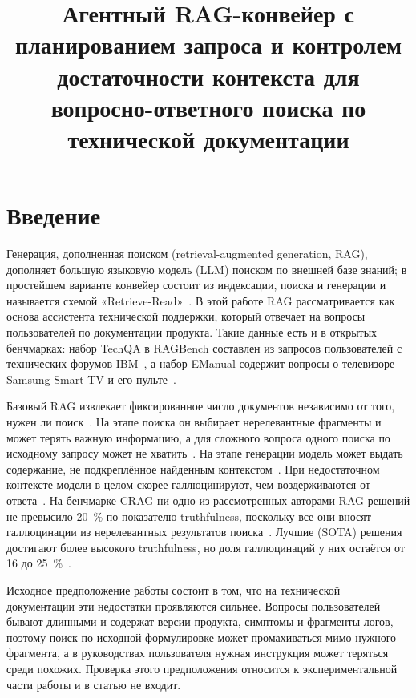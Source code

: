 \documentclass{misisarticle}
\title{Агентный RAG-конвейер с планированием запроса и контролем достаточности контекста для вопросно-ответного поиска по технической документации}
\begin{document}
\maketitle

\section{Введение}

Генерация, дополненная поиском (retrieval-augmented generation, RAG), дополняет большую языковую модель (LLM) поиском по внешней базе знаний; в простейшем варианте конвейер состоит из индексации, поиска и генерации и называется схемой «Retrieve-Read»~\cite{gao2023retrieval}. %
В этой работе RAG рассматривается как основа ассистента технической поддержки, который отвечает на вопросы пользователей по документации продукта.
Такие данные есть и в открытых бенчмарках: набор TechQA в RAGBench составлен из запросов пользователей с технических форумов IBM~\cite{friel2024ragbench}, %
а набор EManual содержит вопросы о телевизоре Samsung Smart TV и его пульте~\cite{friel2024ragbench}. %

Базовый RAG извлекает фиксированное число документов независимо от того, нужен ли поиск~\cite{asai2023selfrag}. %
На этапе поиска он выбирает нерелевантные фрагменты и может терять важную информацию, а для сложного вопроса одного поиска по исходному запросу может не хватить~\cite{gao2023retrieval}. %
На этапе генерации модель может выдать содержание, не подкреплённое найденным контекстом~\cite{gao2023retrieval}. %
При недостаточном контексте модели в целом скорее галлюцинируют, чем воздерживаются от ответа~\cite{joren2024sufficient}. %
На бенчмарке CRAG ни одно из рассмотренных авторами RAG-решений не превысило 20~\% по показателю truthfulness, поскольку все они вносят галлюцинации из нерелевантных результатов поиска~\cite{yang2024crag}. %
Лучшие (SOTA) решения достигают более высокого truthfulness, но доля галлюцинаций у них остаётся от 16 до 25~\%~\cite{yang2024crag}. %

Исходное предположение работы состоит в том, что на технической документации эти недостатки проявляются сильнее.
Вопросы пользователей бывают длинными и содержат версии продукта, симптомы и фрагменты логов, поэтому поиск по исходной формулировке может промахиваться мимо нужного фрагмента, а в руководствах пользователя нужная инструкция может теряться среди похожих.
Проверка этого предположения относится к экспериментальной части работы и в статью не входит.
\end{document}
